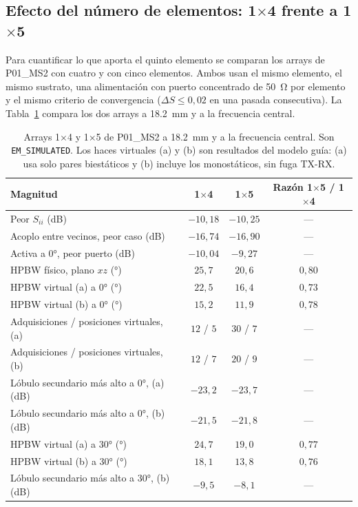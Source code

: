 \documentclass[11pt,a4paper]{article}
\begin{document}
\subsection{Efecto del número de elementos: 1$\times$4 frente a 1$\times$5}\label{sec:n_elementos}
Para cuantificar lo que aporta el quinto elemento se comparan los arrays de P01\_MS2 con cuatro y con cinco elementos. Ambos usan el mismo elemento, el mismo sustrato, una alimentación con puerto concentrado de \SI{50}{\ohm} por elemento y el mismo criterio de convergencia ($\Delta S \le 0{,}02$ en una pasada consecutiva). La Tabla~\ref{tab:n1x4_1x5} compara los dos arrays a \SI{18.2}{mm} y a la frecuencia central.

\begin{table}[H]
    \centering
    \caption{Arrays 1$\times$4 y 1$\times$5 de P01\_MS2 a \SI{18.2}{mm} y a la frecuencia central. Son \texttt{EM\_SIMULATED}. Los haces virtuales (a) y (b) son resultados del modelo guía: (a) usa solo pares biestáticos y (b) incluye los monostáticos, sin fuga TX-RX.}
    \label{tab:n1x4_1x5}
    {\small
    \begin{tabular}{l c c c}
        \toprule
        Magnitud & 1$\times$4 & 1$\times$5 & Razón 1$\times$5 / 1$\times$4 \\
        \midrule
        Peor $S_{ii}$ (\si{dB}) & $-10{,}18$ & $-10{,}25$ & --- \\
        Acoplo entre vecinos, peor caso (\si{dB}) & $-16{,}74$ & $-16{,}90$ & --- \\
        Activa a $0\si{\degree}$, peor puerto (\si{dB}) & $-10{,}04$ & $-9{,}27$ & --- \\
        HPBW físico, plano $xz$ (\si{\degree}) & $25{,}7$ & $20{,}6$ & $0{,}80$ \\
        HPBW virtual (a) a $0\si{\degree}$ (\si{\degree}) & $22{,}5$ & $16{,}4$ & $0{,}73$ \\
        HPBW virtual (b) a $0\si{\degree}$ (\si{\degree}) & $15{,}2$ & $11{,}9$ & $0{,}78$ \\
        Adquisiciones / posiciones virtuales, (a) & $12$ / $5$ & $30$ / $7$ & --- \\
        Adquisiciones / posiciones virtuales, (b) & $12$ / $7$ & $20$ / $9$ & --- \\
        Lóbulo secundario más alto a $0\si{\degree}$, (a) (\si{dB}) & $-23{,}2$ & $-23{,}7$ & --- \\
        Lóbulo secundario más alto a $0\si{\degree}$, (b) (\si{dB}) & $-21{,}5$ & $-21{,}8$ & --- \\
        HPBW virtual (a) a $30\si{\degree}$ (\si{\degree}) & $24{,}7$ & $19{,}0$ & $0{,}77$ \\
        HPBW virtual (b) a $30\si{\degree}$ (\si{\degree}) & $18{,}1$ & $13{,}8$ & $0{,}76$ \\
        Lóbulo secundario más alto a $30\si{\degree}$, (b) (\si{dB}) & $-9{,}5$ & $-8{,}1$ & --- \\
        \bottomrule
    \end{tabular}
    }
\end{table}
\end{document}

